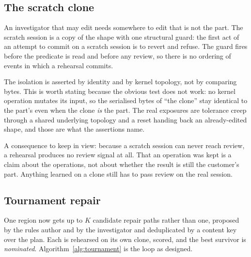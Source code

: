 \documentclass[11pt,onecolumn]{article}
\begin{document}
\subsection{The scratch clone}\label{sec:scratch}

An investigator that may edit needs somewhere to edit that is not the part. The scratch session is
a copy of the shape with one structural guard: the first act of an attempt to commit on a scratch
session is to revert and refuse. The guard fires before the predicate is read and before any
review, so there is no ordering of events in which a rehearsal commits.

The isolation is asserted by identity and by kernel topology, not by comparing bytes. This is worth
stating because the obvious test does not work: no kernel operation mutates its input, so the
serialised bytes of ``the clone'' stay identical to the part's even when the clone \emph{is} the
part. The real exposures are tolerance creep through a shared underlying topology and a reset
handing back an already-edited shape, and those are what the assertions name.

A consequence to keep in view: because a scratch session can never reach review, a rehearsal
produces no review signal at all. That an operation was kept is a claim about the operations, not
about whether the result is still the customer's part. Anything learned on a clone still has to
pass review on the real session.

\subsection{Tournament repair}\label{sec:tournament}

One region now gets up to $K$ candidate repair paths rather than one, proposed by the rules author
and by the investigator and deduplicated by a content key over the plan. Each is rehearsed on its
own clone, scored, and the best survivor is \emph{nominated}. Algorithm~\ref{alg:tournament} is the
loop as designed.
\end{document}
